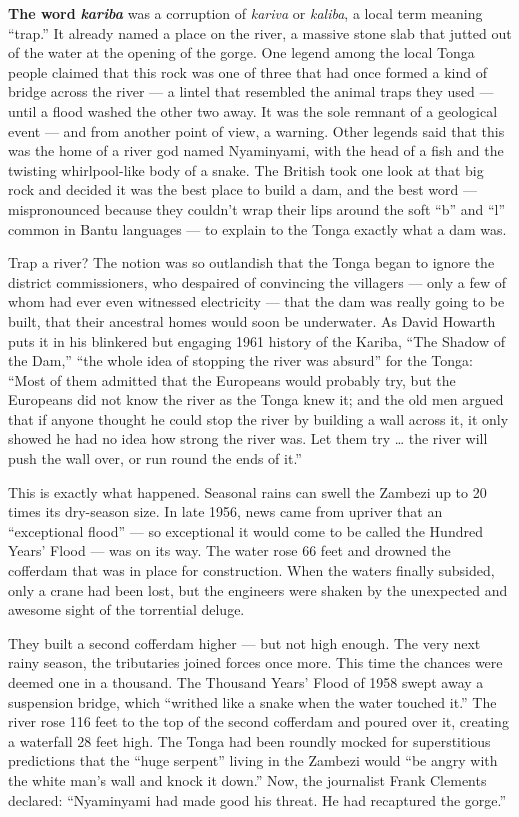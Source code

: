 \textbf{The word} \emph{\textbf{kariba}} was a corruption of
\emph{kariva} or \emph{kaliba}, a local term meaning ``trap.'' It
already named a place on the river, a massive stone slab that jutted out
of the water at the opening of the gorge. One legend among the local
Tonga people claimed that this rock was one of three that had once
formed a kind of bridge across the river --- a lintel that resembled the
animal traps they used --- until a flood washed the other two away. It
was the sole remnant of a geological event --- and from another point of
view, a warning. Other legends said that this was the home of a river
god named Nyaminyami, with the head of a fish and the twisting
whirlpool-like body of a snake. The British took one look at that big
rock and decided it was the best place to build a dam, and the best word
--- mispronounced because they couldn't wrap their lips around the soft
``b'' and ``l'' common in Bantu languages --- to explain to the Tonga
exactly what a dam was.

Trap a river? The notion was so outlandish that the Tonga began to
ignore the district commissioners, who despaired of convincing the
villagers --- only a few of whom had ever even witnessed electricity ---
that the dam was really going to be built, that their ancestral homes
would soon be underwater. As David Howarth puts it in his blinkered but
engaging 1961 history of the Kariba, ``The Shadow of the Dam,'' ``the
whole idea of stopping the river was absurd'' for the Tonga: ``Most of
them admitted that the Europeans would probably try, but the Europeans
did not know the river as the Tonga knew it; and the old men argued that
if anyone thought he could stop the river by building a wall across it,
it only showed he had no idea how strong the river was. Let them try
\ldots{} the river will push the wall over, or run round the ends of
it.''

This is exactly what happened. Seasonal rains can swell the Zambezi up
to 20 times its dry-season size. In late 1956, news came from upriver
that an ``exceptional flood'' --- so exceptional it would come to be
called the Hundred Years' Flood --- was on its way. The water rose 66
feet and drowned the cofferdam that was in place for construction. When
the waters finally subsided, only a crane had been lost, but the
engineers were shaken by the unexpected and awesome sight of the
torrential deluge.

They built a second cofferdam higher --- but not high enough. The very
next rainy season, the tributaries joined forces once more. This time
the chances were deemed one in a thousand. The Thousand Years' Flood of
1958 swept away a suspension bridge, which ``writhed like a snake when
the water touched it.'' The river rose 116 feet to the top of the second
cofferdam and poured over it, creating a waterfall 28 feet high. The
Tonga had been roundly mocked for superstitious predictions that the
``huge serpent'' living in the Zambezi would ``be angry with the white
man's wall and knock it down.'' Now, the journalist Frank Clements
declared: ``Nyaminyami had made good his threat. He had recaptured the
gorge.''

